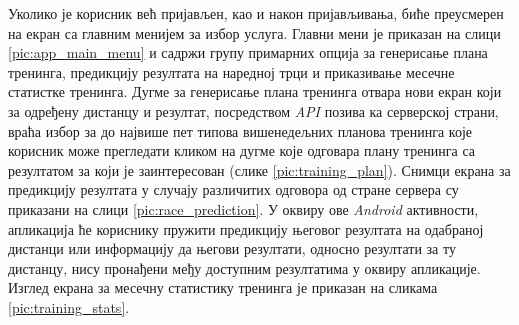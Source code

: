 \documentclass[12pt,oneside]{memoir}
\begin{document}
Уколико је корисник већ пријављен, као и након пријављивања, биће преусмерен на екран са главним менијем за избор услуга. Главни мени је приказан на слици \ref{pic:app_main_menu} и садржи групу примарних опција за генерисање плана тренинга, предикцију резултата на наредној трци и приказивање месечне статистке тренинга. Дугме за генерисање плана тренинга отвара нови екран који за одређену дистанцу и резултат, посредством \textit{API} позива ка серверској страни, враћа избор за до највише пет типова вишенедељних планова тренинга које корисник може прегледати кликом на дугме које одговара плану тренинга са резултатом за који је заинтересован (слике \ref{pic:training_plan}). Снимци екрана за предикцију резултата у случају различитих одговора од стране сервера су приказани на слици \ref{pic:race_prediction}. У оквиру ове \textit{Android} активности, апликација ће кориснику пружити предикцију његовог резултата на одабраној дистанци или информацију да његови резултати, односно резултати за ту дистанцу, нису пронађени међу доступним резултатима у оквиру апликације. Изглед екрана за месечну статистику тренинга је приказан на сликама \ref{pic:training_stats}.
\end{document}
